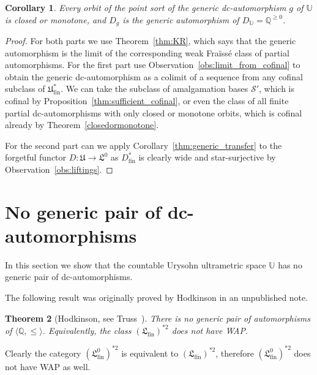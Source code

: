 \documentclass[oneside,notitlepage,12pt]{article}
\newtheorem{tw}{Theorem}[section]
\newtheorem{wn}[tw]{Corollary}
\theoremstyle{definition}
\theoremstyle{remark}
\newcommand \seq [1]{\langle #1 \rangle}
\newcommand \maps {\colon} %
\newcommand \Q {\mathbb{Q}}
\newcommand \Qpos {\Q^{\geq 0}}
\newcommand \U {\mathbb{U}}
\newcommand \Su {\mathscr{S}}
\newcommand \fin {{\operatorname{fin}}}
\newcommand \Lin {\mathfrak{L}}
\newcommand \Ult {\mathfrak{U}}
\begin{document}
\begin{wn}\label{wn:generic-clo or mon}
    Every orbit of the point sort of the generic dc-automorphism $g$ of $\U$ is closed or monotone, and $D_g$ is the generic automorphism of $D_\U = \Qpos$.
\end{wn}
\begin{proof}
    For both parts we use Theorem~\ref{thm:KR}, which says that the generic automorphism is the limit of the corresponding weak Fraïssé class of partial automorphisms.
    For the first part use Observation~\ref{obs:limit_from_cofinal} to obtain the generic dc-automorphism as a colimit of a sequence from any cofinal subclass of $\Ult_\fin^*$.
    We can take the subclass of amalgamation bases $\Su'$, which is cofinal by Proposition~\ref{thm:sufficient_cofinal}, or even the class of all finite partial dc-automorphisms with only closed or monotone orbits, which is cofinal already by Theorem~\ref{closedormonotone}.

   
    For the second part can we apply Corollary~\ref{thm:generic_transfer} to the forgetful functor $D\maps \Ult \to \Lin^0$ as $D^*_\fin$ is clearly wide and star-surjective by Observation~\ref{obs:liftings}.
\end{proof}




\section{No generic pair of dc-automorphisms}
\label{sec:no_pair}

In this section we show that the countable Urysohn ultrametric space $\U$ has no generic pair of dc-automorphisms.

The following result was originally proved by Hodkinson in an unpublished note.

\begin{tw}[{Hodkinson, see Truss~\cite[Theorem~2.4]{T}}]\label{Truss}
    There is no generic pair of automorphisms of $\seq{\Q, \leq}$.
    Equivalently, the class $(\Lin_\fin)^{*2}$ does not have WAP.
\end{tw}

Clearly the category $(\Lin_\fin^0)^{*2}$ is equivalent to $(\Lin_\fin)^{*2}$, therefore $(\Lin_\fin^0)^{*2}$ does not have WAP as well.
\end{document}
